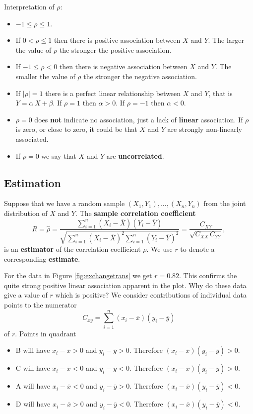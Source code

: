 \documentclass[
  british,
  11pt,
  openany, a4paper]{book}
\providecommand{\tightlist}{%
  \setlength{\itemsep}{0pt}\setlength{\parskip}{0pt}}
\begin{document}
Interpretation of \(\rho\):

\begin{itemize}
\tightlist
\item
  \(-1 \leq \rho \leq 1\).
\item
  If \(0 < \rho \leq 1\) then there is positive association between \(X\) and \(Y\).
  The larger the value of \(\rho\) the stronger the positive association.
\item
  If \(-1 \leq \rho < 0\) then there is negative association between \(X\) and \(Y\).
  The smaller the value of \(\rho\) the stronger the negative association.
\item
  If \(|\rho|=1\) there is a perfect linear relationship between \(X\) and \(Y\), that is
  \(Y=\alpha\,X+\beta\). If \(\rho=1\) then \(\alpha>0\). If \(\rho=-1\) then \(\alpha<0\).
\item
  \(\rho = 0\) does \textbf{not} indicate no association, just a lack of
  \textbf{linear} association. If \(\rho\) is zero, or close to zero, it could be that \(X\) and \(Y\) are strongly non-linearly associated.
\item
  If \(\rho=0\) we say that \(X\) and \(Y\) are \textbf{uncorrelated}.
\end{itemize}

\subsection{Estimation}\label{estimation}

Suppose that we have a random sample \((X_1,Y_1), ..., (X_n,Y_n)\) from the joint distribution of \(X\) and \(Y\). The \textbf{sample correlation coefficient}
\[
R = \hat{\rho} = \frac{\displaystyle\sum_{i=1}^n (X_i-\bar{X})(Y_i-\bar{Y})}
{\sqrt{\displaystyle\sum_{i=1}^n (X_i-\bar{X})^2 \displaystyle\sum_{i=1}^n(Y_i-\bar{Y})^2}} 
= \frac{C_{XY}}{\sqrt{C_{XX}\,C_{YY}}}, 
\]
is an \textbf{estimator} of the correlation coefficient \(\rho\). We use \(r\) to denote a corresponding \textbf{estimate}.

For the data in Figure \ref{fig:exchangetrans} we get \(r=0.82\). This confirms the quite strong positive linear association apparent in the plot. Why do these data give a value of \(r\) which is positive? We consider contributions of individual data points to the numerator
\[  C_{xy}=\displaystyle\sum_{i=1}^n (x_i-\bar{x})(y_i-\bar{y}) \]
of \(r\). Points in quadrant

\begin{itemize}
\tightlist
\item
  B will have \(x_i-\bar{x}>0\) and \(y_i-\bar{y}>0\). Therefore \((x_i-\bar{x})(y_i-\bar{y})>0\).\\
\item
  C will have \(x_i-\bar{x}<0\) and \(y_i-\bar{y}<0\). Therefore \((x_i-\bar{x})(y_i-\bar{y})>0\).\\
\item
  A will have \(x_i-\bar{x}<0\) and \(y_i-\bar{y}>0\). Therefore \((x_i-\bar{x})(y_i-\bar{y})<0\).\\
\item
  D will have \(x_i-\bar{x}>0\) and \(y_i-\bar{y}<0\). Therefore \((x_i-\bar{x})(y_i-\bar{y})<0\).
\end{itemize}
\end{document}
